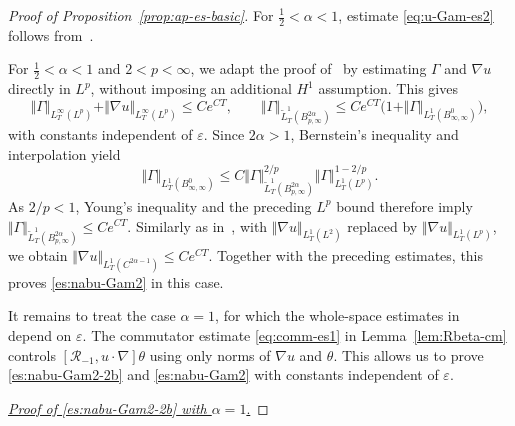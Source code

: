 \documentclass[reqno,11pt,a4paper]{amsart}
\begin{document}
\begin{proof}[Proof of Proposition~\ref{prop:ap-es-basic}]
For $\frac12<\alpha<1$, estimate \eqref{eq:u-Gam-es2}
follows from~\cite[Proposition~3.2]{LXY25}.

For $\frac12<\alpha<1$ and $2<p<\infty$,
we adapt the proof of~\cite[Proposition~3.3]{LXY25}
by estimating $\Gamma$ and $\nabla u$ directly in $L^p$,
without imposing an additional $H^1$ assumption.
This gives
\[
  \Vert \Gamma\Vert _{L^\infty_T(L^p)}
  +\Vert \nabla u\Vert _{L^\infty_T(L^p)}
  \leq Ce^{CT}, \qquad
  \Vert \Gamma\Vert _{\widetilde L^1_T(B^{2\alpha}_{p,\infty})}
  \leq Ce^{CT}
  \bigl(1+\Vert \Gamma\Vert _{L^1_T(B^0_{\infty,\infty})}\bigr),
\]
with constants independent of $\varepsilon$.
Since $2\alpha>1$, Bernstein's inequality
and interpolation yield
\[
  \Vert \Gamma\Vert _{L^1_T(B^0_{\infty,\infty})}
  \leq
  C\Vert \Gamma\Vert _{\widetilde L^1_T(B^{2\alpha}_{p,\infty})}^{2/p}
  \Vert \Gamma\Vert _{L^1_T(L^p)}^{1-2/p}.
\]
As $2/p<1$, Young's inequality and the preceding
$L^p$ bound therefore imply
$\Vert \Gamma\Vert _{\widetilde L^1_T(B^{2\alpha}_{p,\infty})}\leq Ce^{CT}$.
Similarly as in~\cite[Eq.~(75)]{LXY25},
with $\Vert \nabla u\Vert _{L^1_T(L^2)}$ replaced by
$\Vert \nabla u\Vert _{L^1_T(L^p)}$, we obtain
$\Vert \nabla u\Vert _{L^1_T(C^{2\alpha-1})}\leq Ce^{CT}$.
Together with the preceding estimates,
this proves \eqref{es:nabu-Gam2} in this case.

It remains to treat the case $\alpha=1$,
for which the whole-space estimates
in~\cite[Section~3]{LXY25} depend on $\varepsilon$.
The commutator estimate \eqref{eq:comm-es1}
in Lemma~\ref{lem:Rbeta-cm}
controls $[\mathcal R_{-1},u\cdot\nabla]\theta$
using only norms of $\nabla u$ and $\theta$.
This allows us to prove
\eqref{es:nabu-Gam2-2b} and \eqref{es:nabu-Gam2}
with constants independent of $\varepsilon$.
  
\underline{\textit{Proof of \eqref{es:nabu-Gam2-2b} with $\alpha=1$}.}  %


\end{proof}
\end{document}

